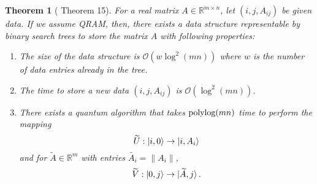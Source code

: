 \documentclass[10pt,twoside,reqno]{amsart} %
\theoremstyle{plain}
\newtheorem{thm}{Theorem}[section]
\theoremstyle{definition}
\begin{document}
\begin{thm}[\cite{kerenidis2017} Theorem 15]
  For a real matrix $A\in\mathbb{R}^{m\times n}$, let $(i,j,A_{ij})$ be given
  data. If we assume QRAM, then, there exists a data structure
  representable by binary search trees to store the matrix $A$ with
  following properties:
  \begin{enumerate}
    \item The size of the data structure is $\mathcal{O}(w \log^2(mn))$ where
    $w$ is the number of data entries already in the tree.
  \item The time to store a new data $(i,j,A_{ij})$ is $\mathcal{O}(\log^2 (mn))$.
  \item There exists a quantum algorithm that takes $\textrm{\normalfont 
    polylog}(mn)$ time to perform the mapping
    \[
      \widetilde{U}:\ket{i,0}\rightarrow \ket{i, A_i}
    \]
    and for $\widetilde{A}\in\mathbb{R}^m$ with entries $\widetilde{A_i}=\|A_i\|$,
    \[
      \widetilde{V}:\ket{0,j}\rightarrow\ket{\widetilde{A},j}.
    \]
  \end{enumerate}
\end{thm}
\end{document}
